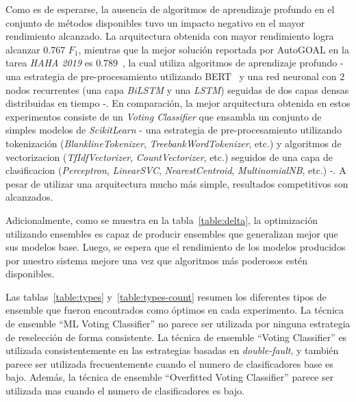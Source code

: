 Como es de esperarse, la ausencia de algoritmos de aprendizaje profundo en el conjunto de métodos disponibles tuvo un impacto negativo en el mayor rendimiento alcanzado.
La arquitectura obtenida con mayor rendimiento logra alcanzar $0.767$ $F_1$, mientras que la mejor solución reportada por AutoGOAL en la tarea \emph{HAHA 2019} es $0.789$~\parencite{estevez2020automatic}, la cual utiliza algoritmos de aprendizaje profundo - una estrategia de pre-procesamiento utilizando BERT~\parencite{devlin2018bert} y una red neuronal con 2 nodos recurrentes (una capa \emph{BiLSTM} y una \emph{LSTM}) seguidas de dos capas densas distribuidas en tiempo -.
En comparación, la mejor arquitectura obtenida en estos experimentos consiste de un \emph{Voting Classifier} que ensambla un conjunto de simples modelos de \emph{ScikitLearn} - una estrategia de pre-procesamiento utilizando tokenización (\emph{BlanklineTokenizer}, \emph{TreebankWordTokenizer}, etc.) y algoritmos de vectorizacion (\emph{TfIdfVectorizer}, \emph{CountVectorizer}, etc.) seguidos de una capa de clasificacion (\emph{Perceptron}, \emph{LinearSVC}, \emph{NearestCentroid}, \emph{MultinomialNB}, etc.) -.
A pesar de utilizar una arquitectura mucho más simple, resultados competitivos son alcanzados.

Adicionalmente, como se muestra en la tabla~\ref{table:delta}, la optimización utilizando ensembles es capaz de producir ensembles que generalizan mejor que sus modelos base.
Luego, se espera que el rendimiento de los modelos producidos por nuestro sistema mejore una vez que algoritmos más poderosos estén disponibles.

Las tablas~\ref{table:types} y~\ref{table:types-count} resumen los diferentes tipos de ensemble que fueron encontrados como óptimos en cada experimento.
La técnica de ensemble ``ML Voting Classifier'' no parece ser utilizada por ninguna estrategia de reselección de forma consistente.
La técnica de ensemble ``Voting Classifier'' es utilizada consistentemente en las estrategias basadas en \emph{double-fault}, y también parece ser utilizada frecuentemente cuando el numero de clasificadores base es bajo.
Además, la técnica de ensemble ``Overfitted Voting Classifier'' parece ser utilizada mas cuando el numero de clasificadores es bajo.

